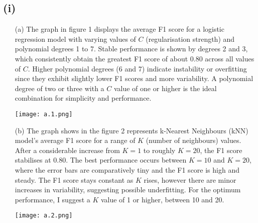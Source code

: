 \documentclass[a4paper,10pt]{article}
\begin{document}
\subsection*{(i)}
\begin{enumerate}
    \item[(a)]   
The graph in figure 1 displays the average F1 score for a logistic regression model with varying values of $C$ (regularisation strength) and polynomial degrees 1 to 7. Stable performance is shown by degrees 2 and 3, which consistently obtain the greatest F1 score of about 0.80 across all values of $C$. Higher polynomial degrees (6 and 7) indicate instability or overfitting since they exhibit slightly lower F1 scores and more variability. A polynomial degree of two or three with a $C$ value of one or higher is the ideal combination for simplicity and performance.    \begin{center}
        \centering
        \texttt{[image: a.1.png]}
        \label{}
    \end{center}
\item[(b)]   
The graph shows in the figure 2 represents k-Nearest Neighbours (kNN) model's average F1 score for a range of $K$ (number of neighbours) values. After a considerable increase from $K = 1$ to roughly $K = 20$, the F1 score stabilises at 0.80. The best performance occurs between $K = 10$ and $K = 20$, where the error bars are comparatively tiny and the F1 score is high and steady. The F1 score stays constant as $K$ rises, however there are minor increases in variability, suggesting possible underfitting. For the optimum performance, I suggest a $K$ value of 1 or higher, between 10 and 20.    
       \begin{center}
        \centering
        \texttt{[image: a.2.png]}
        \label{}
    \end{center} 


\end{enumerate}
\end{document}
